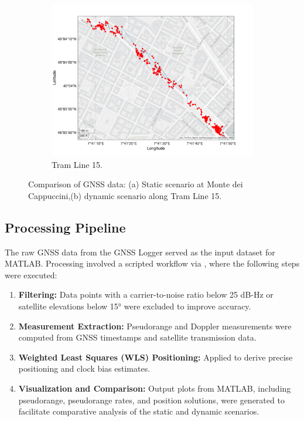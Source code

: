 \begin{figure}[h!]
\begin{subfigure}{0.23\textwidth}
                \includegraphics[width=\textwidth]{images/tests/Tram_15_trip_Castello_to_Pescatore/filtered/Samsung_A51_Tram_15_trip_Castello_to_Pescatore_fig6.png}
                \caption{Tram Line 15.}
                \label{fig:dynamic_scenario}
            \end{subfigure}
            \vspace{0.35cm}
            \caption{Comparison of GNSS data: (a) Static scenario at Monte dei Cappuccini,(b) dynamic scenario along Tram Line 15.}
            \label{fig:gnss_comparison}
        \end{figure}

    \subsection{Processing Pipeline}
    
        The raw GNSS data from the GNSS Logger served as the input dataset for MATLAB. 
        Processing involved a scripted workflow via , where the following steps were executed:
        
        \begin{enumerate}
            \item \textbf{Filtering:} Data points with a carrier-to-noise ratio below 25 dB-Hz or satellite elevations below 15° were excluded to improve accuracy.
            \item \textbf{Measurement Extraction:} Pseudorange and Doppler measurements were computed from GNSS timestamps and satellite transmission data.
            \item \textbf{Weighted Least Squares (WLS) Positioning:} Applied to derive precise positioning and clock bias estimates.
            \item \textbf{Visualization and Comparison:} Output plots from MATLAB, including pseudorange, pseudorange rates, and position solutions, were generated to facilitate comparative analysis of the static and dynamic scenarios.
        \end{enumerate}


